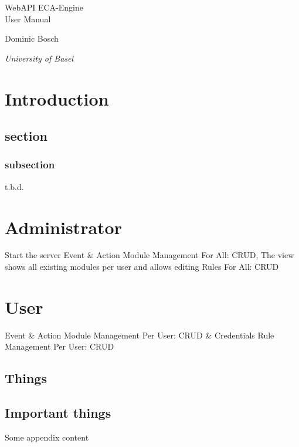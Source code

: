 \documentclass{article}
\newcommand*{\createTitlePage}{\begingroup
\centering
\vspace*{6\baselineskip}

{\Huge WebAPI ECA-Engine}\\[4\baselineskip]

{\LARGE User Manual} \\[\baselineskip]

\vspace*{25\baselineskip}

{Dominic Bosch\par}
{\itshape University of Basel\par}




\endgroup}
\begin{document}
\clearpage\createTitlePage
\thispagestyle{empty}


\newpage
\tableofcontents
\newpage


\section{Introduction}
\subsection{section}
\subsubsection{subsection}
t.b.d.

\section{Administrator}
Start the server
Event \& Action Module Management
For All: CRUD, The view shows all existing modules per user and allows editing
Rules
For All: CRUD
\section{User}
Event \& Action Module Management
Per User: CRUD \& Credentials
Rule Management\cite{2005-Patranjan-TLE.pdf}
Per User: CRUD






\newpage
\renewcommand*\appendixpagename{APPENDIX}
\renewcommand*\appendixtocname{APPENDIX}
\begin{appendices}
 \section{Things}
   \subsection{Important things}
 Some appendix content
 
\end{appendices}
\end{document}
